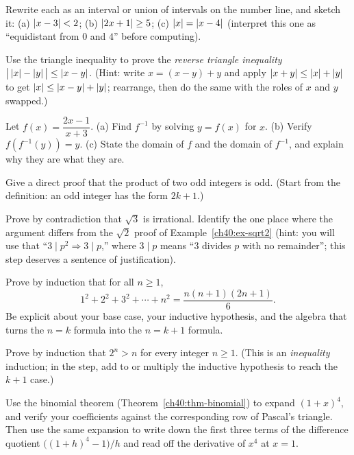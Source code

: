 \begin{exercise}
\label{ch40:exr-absval}
Rewrite each as an interval or union of intervals on the number line, and sketch
it:
(a) $\lvert x-3\rvert < 2$;\quad
(b) $\lvert2x+1\rvert \ge 5$;\quad
(c) $\lvert x\rvert = \lvert x-4\rvert$ (interpret this one as ``equidistant from $0$ and $4$''
before computing).
\end{exercise}

\begin{exercise}
\label{ch40:exr-triangle}
Use the triangle inequality to prove the \emph{reverse triangle inequality}
$\bigl|\,\lvert x\rvert-\lvert y\rvert\,\bigr| \le \lvert x-y\rvert$.
(Hint: write $x = (x-y) + y$ and apply $\lvert x+y\rvert\le\lvert x\rvert+\lvert y\rvert$ to get
$\lvert x\rvert \le \lvert x-y\rvert + \lvert y\rvert$; rearrange, then do the same with the roles of
$x$ and $y$ swapped.)
\end{exercise}

\begin{exercise}
\label{ch40:exr-inverse}
Let $f(x) = \dfrac{2x-1}{x+3}$.
(a) Find $f^{-1}$ by solving $y = f(x)$ for $x$.
(b) Verify $f(f^{-1}(y)) = y$.
(c) State the domain of $f$ and the domain of $f^{-1}$, and explain why they are
what they are.
\end{exercise}

\begin{exercise}
\label{ch40:exr-direct}
Give a direct proof that the product of two odd integers is odd. (Start from the
definition: an odd integer has the form $2k+1$.)
\end{exercise}

\begin{exercise}
\label{ch40:exr-contradiction}
Prove by contradiction that $\sqrt 3$ is irrational. Identify the one place where
the argument differs from the $\sqrt 2$ proof of Example~\ref{ch40:ex-sqrt2}
(hint: you will use that ``$3 \mid p^2 \Rightarrow 3 \mid p$,'' where $3 \mid p$
means ``$3$ divides $p$ with no remainder''; this step deserves a sentence of
justification).
\end{exercise}

\begin{exercise}
\label{ch40:exr-induction-squares}
Prove by induction that for all $n \ge 1$,
\[
  1^2 + 2^2 + 3^2 + \cdots + n^2 = \frac{n(n+1)(2n+1)}{6}.
\]
Be explicit about your base case, your inductive hypothesis, and the algebra that
turns the $n=k$ formula into the $n=k+1$ formula.
\end{exercise}

\begin{exercise}
\label{ch40:exr-induction-ineq}
Prove by induction that $2^n > n$ for every integer $n \ge 1$. (This is an
\emph{inequality} induction; in the step, add to or multiply the inductive
hypothesis to reach the $k+1$ case.)
\end{exercise}

\begin{exercise}
\label{ch40:exr-binomial}
Use the binomial theorem (Theorem~\ref{ch40:thm-binomial}) to expand $(1+x)^4$,
and verify your coefficients against the corresponding row of Pascal's triangle.
Then use the same expansion to write down the first three terms of the difference
quotient $\bigl((1+h)^4 - 1\bigr)/h$ and read off the derivative of $x^4$ at
$x=1$.
\end{exercise}
